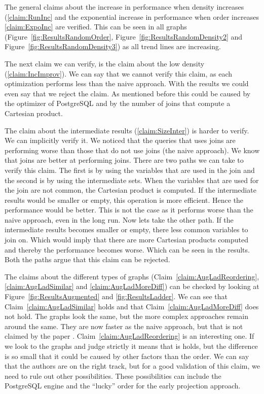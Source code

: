 The general claims about the increase in performance when density increases (\ref{claim:RunInc} and the exponential increase in performance when order increases \ref{claim:ExpoInc} are verified. This can be seen in all graphs (Figure~\ref{fig:ResultsRandomOrder}, Figure~\ref{fig:ResultsRandomDensity2} and Figure~\ref{fig:ResultsRandomDensity3}) as all trend lines are increasing. 

The next claim we can verify, is the claim about the low density (\ref{claim:IncImprov}). We can say that we cannot verify this claim, as each optimization performs less than the naive approach. With the results we could even say that we reject the claim. As mentioned before this could be caused by the optimizer of PostgreSQL and by the number of joins that compute a Cartesian product.

The claim about the intermediate results (\ref{claim:SizeInter}) is harder to verify. We can implicitly verify it. We noticed that the queries that uses joins are performing worse than those that do not use joins (the naive approach). We know that joins are better at performing joins. There are two paths we can take to verify this claim. The first is by using the variables that are used in the join and the second is by using the intermediate sets. When the variables that are used for the join are not common, the Cartesian product is computed. If the intermediate results would be smaller or empty, this operation is more efficient. Hence the performance would be better. This is not the case as it performs worse than the naive approach, even in the long run. Now lets take the other path. If the intermediate results becomes smaller or empty, there less common variables to join on. Which would imply that there are more Cartesian products computed and thereby the performance becomes worse. Which can be seen in the results. Both the paths argue that this claim can be rejected.

The claims about the different types of graphs (Claim~\ref{claim:AugLadReordering}, \ref{claim:AugLadSimilar} and \ref{claim:AugLadMoreDiff}) can be checked by looking at Figure~\ref{fig:ResultsAugmented} and \ref{fig:ResultsLadder}. We can see that Claim~\ref{claim:AugLadSimilar} holds and that Claim~\ref{claim:AugLadMoreDiff} does not hold. The graphs look the same, but the more complex approaches remain around the same. They are now faster as the naive approach, but that is not claimed by the paper \cite{paper}.   Claim~\ref{claim:AugLadReordering} is an interesting one. If we look to the graphs and judge strictly it means that is holds, but the difference is so small that it could be caused by other factors than the order. We can say that the authors are on the right track, but for a good validation of this claim, we need to rule out other possibilities. These possibilities can include the PostgreSQL engine and the ``lucky'' order for the early projection approach. 